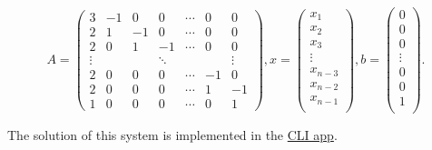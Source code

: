 \documentclass[12pt]{article}
\begin{document}
$$ 
A = \begin{pmatrix} 
3 & -1 & 0 & 0 & \cdots & 0 & 0 \\ 
2 & 1 & -1 & 0 & \cdots & 0 & 0 \\
2 & 0 & 1 & -1 & \cdots & 0 & 0 \\
\vdots &&& \ddots &&& \vdots \\
2 & 0 & 0 & 0 & \cdots & -1 & 0 \\
2 & 0 & 0 & 0 & \cdots & 1 & -1 \\
1 & 0 & 0 & 0 & \cdots & 0 & 1 
\end{pmatrix}, 
x = \begin{pmatrix}
x_1 \\
x_2 \\
x_3 \\
\vdots \\
x_{n-3} \\
x_{n-2} \\
x_{n-1} \\
\end{pmatrix}, 
b = \begin{pmatrix}
0 \\
0 \\
0 \\
\vdots \\
0 \\
0 \\
1 \\
\end{pmatrix}.
$$

The solution of this system is implemented in the 
\href{https://github.com/DenisMaley/closest-number-cli}{CLI app}.

\bigskip
\end{document}
